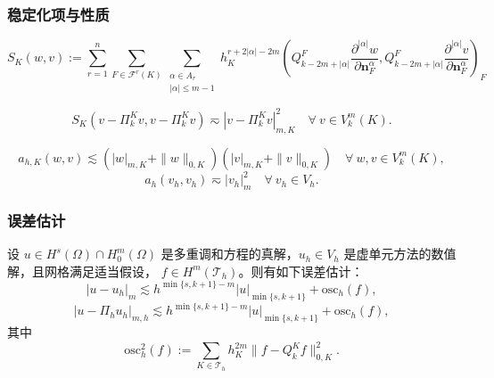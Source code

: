 \documentclass[notheorems,serif]{beamer}
\begin{document}
\begin{frame}
\frametitle{稳定化项与性质}

\begin{definition}[稳定化项]
  \footnotesize{
  $$
  S_K(w, v) := \sum_{r=1}^{n} \sum_{F \in \mathcal{F}^{r}(K)} \sum_{\substack{\alpha \in A_r \\ |\alpha| \leq m-1}} 
  h_K^{r + 2|\alpha| - 2m}
  \left(Q_{k - 2m + |\alpha|}^{F} \frac{\partial^{|\alpha|} w}{\partial \boldsymbol{n}_F^{\alpha}},
        Q_{k - 2m + |\alpha|}^{F} \frac{\partial^{|\alpha|} v}{\partial \boldsymbol{n}_F^{\alpha}}\right)_F
  $$
  }
\end{definition}

\begin{lemma}[稳定化项等价性]
  $$
  S_K(v - \Pi_k^K v, v - \Pi_k^K v) \eqsim |v - \Pi_k^K v|_{m, K}^2
  \quad \forall~v \in V_k^m(K).
  $$
\end{lemma}

\begin{lemma}[强制性]
  $$
  a_{h,K}(w, v) \lesssim (|w|_{m, K} + \|w\|_{0, K}) (|v|_{m, K} + \|v\|_{0, K})
  \quad \forall~w, v \in V_k^m(K),
  $$
  $$
  a_h(v_h, v_h) \eqsim |v_h|_m^2 \quad \forall~v_h \in V_h.
  $$
\end{lemma}

\end{frame}


\begin{frame}
\frametitle{误差估计}
\begin{theorem}\label{errorestimate}
设 $u \in H^s(\Omega) \cap H_0^m(\Omega)$ 是多重调和方程的真解，$u_h \in V_h$ 
是虚单元方法的数值解，且网格满足适当假设，
$f \in H^m(\mathcal{T}_h)$。则有如下误差估计：
$$
|u - u_h|_m \lesssim h^{\min\{s, k+1\} - m} |u|_{\min\{s, k+1\}} + \textrm{osc}_h(f),
$$
$$
|u - \Pi_h u_h|_{m, h} \lesssim h^{\min\{s, k+1\} - m} |u|_{\min\{s, k+1\}} + \textrm{osc}_h(f),
$$
其中
$$
\textrm{osc}_h^2(f) := \sum_{K \in \mathcal{T}_h} h_K^{2m} \|f - Q_k^K f\|_{0, K}^2.
$$
\end{theorem}
\end{frame}
\end{document}
